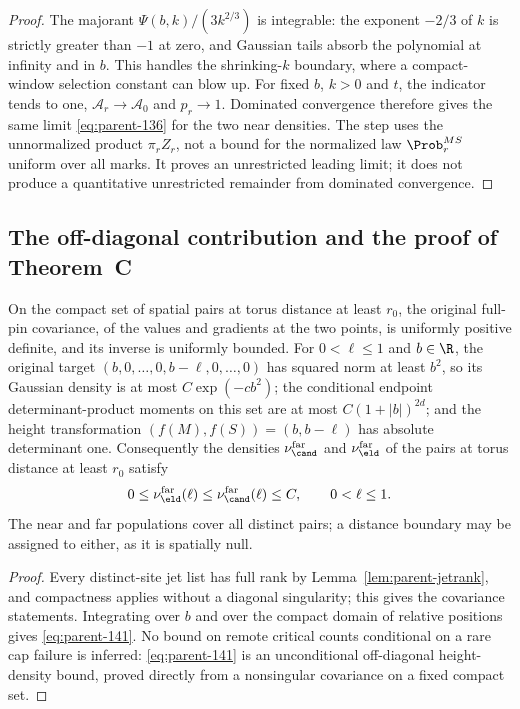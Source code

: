 \begin{proof}
The majorant $\Psi(b,k)/(3k^{2/3})$ is integrable: the exponent $-2/3$ of $k$ is strictly greater than $-1$ at zero, and Gaussian tails absorb the polynomial at infinity and in $b$. This handles the shrinking-$k$ boundary, where a compact-window selection constant can blow up. For fixed $b$, $k>0$ and $t$, the indicator tends to one, $\mathcal A_r\to\mathcal A_0$ and $p_r\to1$. Dominated convergence therefore gives the same limit \eqref{eq:parent-136} for the two near densities. The step uses the unnormalized product $\pi_rZ_r$, not a bound for the normalized law $\Prob^{MS}_r$ uniform over all marks. It proves an unrestricted leading limit; it does not produce a quantitative unrestricted remainder from dominated convergence.
\end{proof}

\subsection{The off-diagonal contribution and the proof of Theorem~C}\label{ssec:parent-far}

\begin{lemma}\label{lem:parent-far}
On the compact set of spatial pairs at torus distance at least $r_0$, the original full-pin covariance, of the values and gradients at the two points, is uniformly positive definite, and its inverse is uniformly bounded. For $0<\ell\le1$ and $b\in\R$, the original target $(b,0,\dots,0,b-\ell,0,\dots,0)$ has squared norm at least $b^2$, so its Gaussian density is at most $C\exp(-cb^2)$; the conditional endpoint determinant-product moments on this set are at most $C(1+|b|)^{2d}$; and the height transformation $(f(M),f(S))=(b,b-\ell)$ has absolute determinant one. Consequently the densities $\nu^{\rm far}_\cand$ and $\nu^{\rm far}_\eld$ of the pairs at torus distance at least $r_0$ satisfy
\begin{equation}\label{eq:parent-141}
0\le\nu^{\rm far}_\eld(\ell)\le\nu^{\rm far}_\cand(\ell)\le C,\qquad 0<\ell\le1 .
\end{equation}
The near and far populations cover all distinct pairs; a distance boundary may be assigned to either, as it is spatially null.
\end{lemma}

\begin{proof}
Every distinct-site jet list has full rank by Lemma~\ref{lem:parent-jetrank}, and compactness applies without a diagonal singularity; this gives the covariance statements. Integrating over $b$ and over the compact domain of relative positions gives \eqref{eq:parent-141}. No bound on remote critical counts conditional on a rare cap failure is inferred: \eqref{eq:parent-141} is an unconditional off-diagonal height-density bound, proved directly from a nonsingular covariance on a fixed compact set.
\end{proof}

